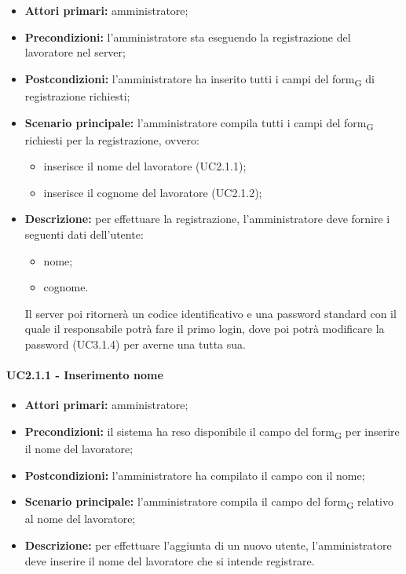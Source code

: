 \begin{itemize}
	\item 	\textbf{Attori primari:} amministratore;
	\item 	\textbf{Precondizioni:}	l'amministratore sta eseguendo la registrazione del lavoratore nel server;
	\item 	\textbf{Postcondizioni:} l'amministratore ha inserito tutti i campi del form\textsubscript{G} di registrazione richiesti;
	\item 	\textbf{Scenario principale:} l'amministratore compila tutti i campi del form\textsubscript{G} richiesti per la registrazione, ovvero:
	\begin{itemize}
		\item inserisce il nome del lavoratore (UC2.1.1);
		\item inserisce il cognome del lavoratore (UC2.1.2);
	\end{itemize}
	\item 	\textbf{Descrizione:} per effettuare la registrazione, l'amministratore deve fornire i seguenti dati dell'utente:
	\begin{itemize}
		\item nome;
		\item cognome.
	\end{itemize}
Il server poi ritornerà un codice identificativo e una password standard con il quale il responsabile potrà fare il primo login, dove poi potrà modificare la password (UC3.1.4) per averne una tutta sua.
\end{itemize}

\paragraph{UC2.1.1 - Inserimento nome}
\begin{itemize}
	\item 	\textbf{Attori primari:} amministratore;
	\item 	\textbf{Precondizioni:} il sistema ha reso disponibile il campo del form\textsubscript{G} per inserire il nome del lavoratore;
	\item 	\textbf{Postcondizioni:} l'amministratore ha compilato il campo con il nome;
	\item 	\textbf{Scenario principale:} l'amministratore compila il campo del form\textsubscript{G} relativo al nome del lavoratore;
	\item 	\textbf{Descrizione:} per effettuare l'aggiunta di un nuovo utente, l'amministratore deve inserire il nome del lavoratore che si intende registrare.

\end{itemize}

